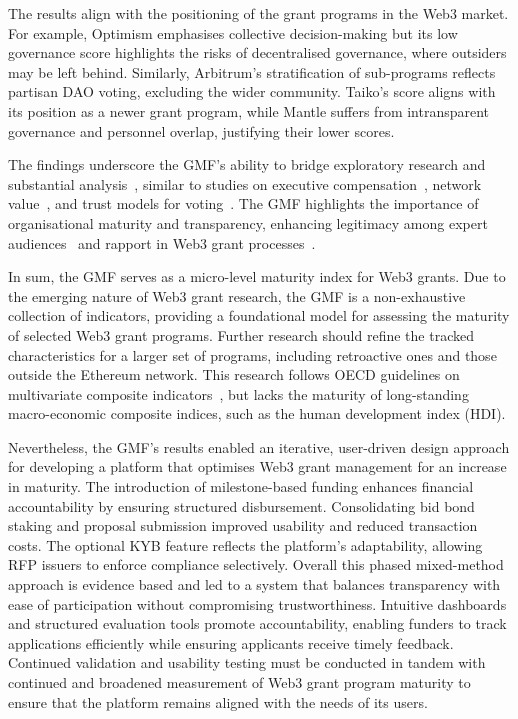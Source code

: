 \documentclass[conference]{IEEEtran}
\begin{document}
The results align with the positioning of the grant programs in the Web3 market. For example, Optimism emphasises collective decision-making but its low governance score highlights the risks of decentralised governance, where outsiders may be left behind. Similarly, Arbitrum’s stratification of sub-programs reflects partisan DAO voting, excluding the wider community. Taiko’s score aligns with its position as a newer grant program, while Mantle suffers from intransparent governance and personnel overlap, justifying their lower scores.

The findings underscore the GMF’s ability to bridge exploratory research and substantial analysis~\cite{mukumbang_retroductive_2023}, similar to studies on executive compensation~\cite{billett_stockholder_2010}, network value~\cite{papaioannou_business_2023}, and trust models for voting~\cite{baranski_trust-centric_2024,lin_voting_2023}. The GMF highlights the importance of organisational maturity and transparency, enhancing legitimacy among expert audiences~\cite[p.~116]{curtin_does_2006} and rapport in Web3 grant processes~\cite{suddaby_legitimacy_2017}.

In sum, the GMF serves as a micro-level maturity index for Web3 grants. Due to the emerging nature of Web3 grant research, the GMF is a non-exhaustive collection of indicators, providing a foundational model for assessing the maturity of selected Web3 grant programs. Further research should refine the tracked characteristics for a larger set of programs, including retroactive ones and those outside the Ethereum network. This research follows OECD guidelines on multivariate composite indicators~\cite{oecd_handbook_2008}, but lacks the maturity of long-standing macro-economic composite indices, such as the human development index (HDI).

Nevertheless, the GMF's results enabled an iterative, user-driven design approach for developing a platform that optimises Web3 grant management for an increase in maturity. The introduction of milestone-based funding enhances financial accountability by ensuring structured disbursement. Consolidating bid bond staking and proposal submission improved usability and reduced transaction costs. The optional KYB feature reflects the platform’s adaptability, allowing RFP issuers to enforce compliance selectively. Overall this phased mixed-method approach is evidence based and led to a system that balances transparency with ease of participation without compromising trustworthiness. Intuitive dashboards and structured evaluation tools promote accountability, enabling funders to track applications efficiently while ensuring applicants receive timely feedback. Continued validation and usability testing must be conducted in tandem with continued and broadened measurement of Web3 grant program maturity to ensure that the platform remains aligned with the needs of its users.
\end{document}
